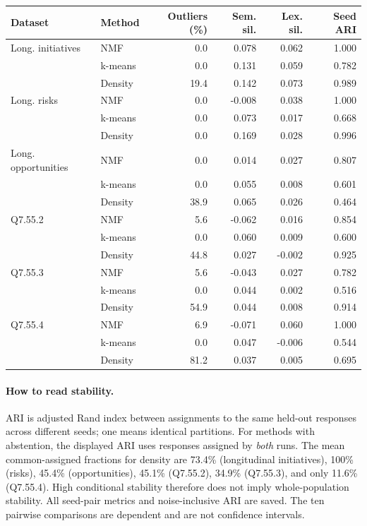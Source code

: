 \documentclass[11pt,a4paper]{article}
\begin{document}
\begin{center}
\small
\begin{tabular}{llrrrr}
\toprule
Dataset & Method & Outliers (\%) & Sem. sil. & Lex. sil. & Seed ARI \\
\midrule
Long. initiatives & NMF & 0.0 & 0.078 & 0.062 & 1.000 \\
 & k-means & 0.0 & 0.131 & 0.059 & 0.782 \\
 & Density & 19.4 & 0.142 & 0.073 & 0.989 \\
\addlinespace
Long. risks & NMF & 0.0 & -0.008 & 0.038 & 1.000 \\
 & k-means & 0.0 & 0.073 & 0.017 & 0.668 \\
 & Density & 0.0 & 0.169 & 0.028 & 0.996 \\
\addlinespace
Long. opportunities & NMF & 0.0 & 0.014 & 0.027 & 0.807 \\
 & k-means & 0.0 & 0.055 & 0.008 & 0.601 \\
 & Density & 38.9 & 0.065 & 0.026 & 0.464 \\
\addlinespace
Q7.55.2 & NMF & 5.6 & -0.062 & 0.016 & 0.854 \\
 & k-means & 0.0 & 0.060 & 0.009 & 0.600 \\
 & Density & 44.8 & 0.027 & -0.002 & 0.925 \\
\addlinespace
Q7.55.3 & NMF & 5.6 & -0.043 & 0.027 & 0.782 \\
 & k-means & 0.0 & 0.044 & 0.002 & 0.516 \\
 & Density & 54.9 & 0.044 & 0.008 & 0.914 \\
\addlinespace
Q7.55.4 & NMF & 6.9 & -0.071 & 0.060 & 1.000 \\
 & k-means & 0.0 & 0.047 & -0.006 & 0.544 \\
 & Density & 81.2 & 0.037 & 0.005 & 0.695 \\
\bottomrule
\end{tabular}
\end{center}

\paragraph{How to read stability.}
ARI is adjusted Rand index between assignments to the same held-out
responses across different seeds; one means identical partitions.
For methods with abstention, the displayed ARI uses responses assigned
by \emph{both} runs. The mean common-assigned fractions for density are
73.4\% (longitudinal initiatives), 100\% (risks), 45.4\% (opportunities),
45.1\% (Q7.55.2), 34.9\% (Q7.55.3), and only 11.6\% (Q7.55.4).
High conditional stability therefore does not imply whole-population
stability. All seed-pair metrics and noise-inclusive ARI are saved.
The ten pairwise comparisons are dependent and are not confidence intervals.
\end{document}
